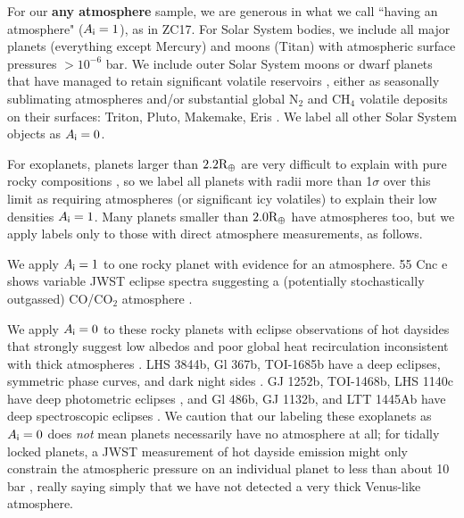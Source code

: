 \documentclass[modern,linenumbers,trackchanges]{aastex7}
\begin{document}
For our {\bf any atmosphere} sample, we are generous in what we call ``having an atmosphere" ($A_{\sf i} = 1$), as in ZC17. For Solar System bodies, we include all major planets (everything except Mercury) and moons (Titan) with atmospheric surface pressures $>10^{-6}$ bar. We include outer Solar System moons or dwarf planets that have managed to retain significant volatile reservoirs \citep{schallerVolatileLossRetention2007}, either as seasonally sublimating atmospheres and/or substantial global N$_2$ and CH$_4$ volatile deposits on their surfaces: Triton, Pluto, Makemake, Eris \citep{youngStructureCompositionPlutos2018, sicardyConstraintsEvolutionTriton2024, grundyModerateRatiosMethane2024}. We label all other Solar System objects as $A_{\sf i} = 0$.

For exoplanets, planets larger than $2.2 \rm {R_\oplus}$ are very difficult to explain with pure rocky compositions \citep{rogersMost16Earthradius2015b, zengNewPerspectivesExoplanet2021, rogersMostSuperEarthsHave2025}, so we label all planets 
with radii more than 1$\sigma$ over this limit as requiring atmospheres (or significant icy volatiles) to explain their low densities $A_{\sf i} = 1$. Many planets smaller than $2.0 \rm {R_\oplus}$ have atmospheres too, but we apply labels only to those with direct atmosphere measurements, as follows.

We apply $A_{\sf i} = 1$ to one rocky planet with evidence for an atmosphere. 55 Cnc e shows variable JWST eclipse spectra suggesting a (potentially stochastically outgassed) CO/CO$_2$ atmosphere \citep{huSecondaryAtmosphereRocky2024, patelSecondaryAtmosphereRocky2024}. 

We apply $A_{\sf i} = 0$ to these rocky planets with eclipse observations of hot daysides that strongly suggest low albedos and poor global heat recirculation inconsistent with thick atmospheres \citep[see][]{kollIdentifyingCandidateAtmospheres2019c, mansfieldIdentifyingAtmospheresRocky2019b}. LHS 3844b, Gl 367b, TOI-1685b have a deep eclipses, symmetric phase curves, and dark night sides \citep{kreidbergAbsenceThickAtmosphere2019a, zhangGJ367bDark2024, luqueDarkBareRock2024}. GJ 1252b, TOI-1468b, LHS 1140c have deep photometric eclipses \citep{crossfieldGJ1252bHot2022, meiervaldesHotRocksSurvey2025, fortuneHotRocksSurvey2025a}, and
Gl 486b, GJ 1132b, and LTT 1445Ab have deep spectroscopic eclipses \citep{weinermansfieldNoThickAtmosphere2024, xueJWSTThermalEmission2024a, wachiraphanThermalEmissionSpectrum2025a}. We caution that our labeling these exoplanets as $A_{\sf i} = 0$ does {\em not} mean planets necessarily have no atmosphere at all; for tidally locked planets, a JWST measurement of hot dayside emission might only constrain the atmospheric pressure on an individual planet to less than about 10 bar \citep{kollScalingAtmosphericHeat2022}, really saying simply that we have not detected a very thick Venus-like atmosphere.
\end{document}
